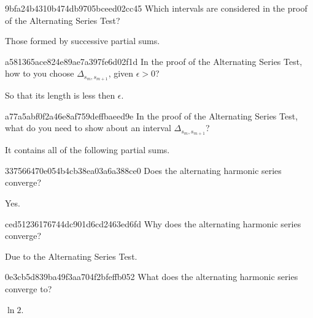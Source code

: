 \begin{note}{9bfa24b4310b474db9705bceed02cc45}
    Which intervals are considered in the proof of the Alternating Series Test?

    \begin{cloze}{1}
        Those formed by successive partial sums.
    \end{cloze}
\end{note}

\begin{note}{a581365ace824e89ae7a397fe6d02f1d}
    In the proof of the Alternating Series Test, how to you choose \({ \Delta_{s_m, s_{m+1}} }\), given \({ \epsilon > 0 }\)?

    \begin{cloze}{1}
        So that its length is less then \({ \epsilon }\).
    \end{cloze}
\end{note}

\begin{note}{a77a5abf0f2a46e8af759deffbaeed9e}
    In the proof of the Alternating Series Test, what do you need to show about an interval \({ \Delta_{s_m, s_{m+1}} }\)?

    \begin{cloze}{1}
        It contains all of the following partial sums.
    \end{cloze}
\end{note}

\begin{note}{337566470e054b4cb38ea03a6a388ce0}
    Does the alternating harmonic series converge?

    \begin{cloze}{1}
        Yes.
    \end{cloze}
\end{note}

\begin{note}{ced51236176744dc901d6cd2463ed6fd}
    Why does the alternating harmonic series converge?

    \begin{cloze}{1}
        Due to the Alternating Series Test.
    \end{cloze}
\end{note}

\begin{note}{0e3cb5d839ba49f3aa704f2bfeffb052}
    What does the alternating harmonic series converge to?

    \begin{cloze}{1}
        \({ \ln 2 }\).
    \end{cloze}
\end{note}

